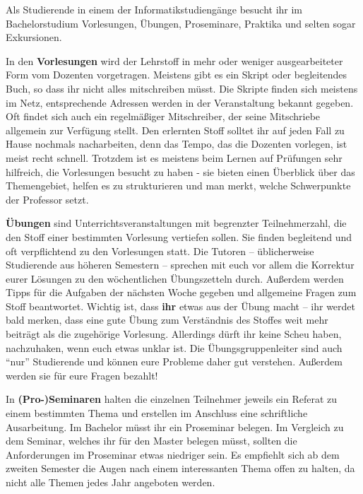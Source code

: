 
Als Studierende in einem der Informatikstudiengänge besucht ihr im
  Bachelorstudium Vorlesungen, Übungen, Proseminare, Praktika
  und selten sogar Exkursionen.

In den \textbf{Vorlesungen} wird der Lehrstoff in mehr oder weniger
  ausgearbeiteter Form vom Dozenten vorgetragen.  Meistens gibt
  es ein Skript oder begleitendes Buch, so dass ihr nicht alles mitschreiben 
  müsst.  Die Skripte finden sich meistens im Netz, entsprechende Adressen 
  werden in der Veranstaltung bekannt gegeben. Oft findet sich auch ein 
  regelmäßiger Mitschreiber, der seine Mitschriebe allgemein zur Verfügung 
  stellt. Den erlernten Stoff solltet ihr auf jeden Fall zu Hause nochmals 
  nacharbeiten, denn das Tempo, das die Dozenten vorlegen, ist meist recht 
  schnell. Trotzdem ist es meistens beim Lernen auf Prüfungen sehr hilfreich, 
  die Vorlesungen besucht zu haben - sie bieten einen Überblick über das 
  Themengebiet, helfen es zu strukturieren und man merkt, welche Schwerpunkte 
  der Professor setzt.

\textbf{Übungen} sind Unterrichtsveranstaltungen mit begrenzter
  Teilnehmerzahl, die den Stoff einer bestimmten Vorlesung vertiefen
  sollen. Sie finden begleitend und oft verpflichtend zu den
  Vorlesungen statt. Die Tutoren -- üblicherweise Studierende aus höheren
  Semestern -- sprechen mit euch vor allem die Korrektur eurer
  Lösungen zu den wöchentlichen Übungszetteln durch.  Außerdem
  werden Tipps für die Aufgaben der nächsten Woche gegeben und
  allgemeine Fragen zum Stoff beantwortet.  Wichtig ist, dass \textbf{ihr}
  etwas aus der Übung macht -- ihr werdet bald merken, dass eine gute
  Übung zum Verständnis des Stoffes weit mehr beiträgt als die
  zugehörige Vorlesung.  Allerdings dürft ihr keine Scheu haben,
  nachzuhaken, wenn euch etwas unklar ist.  Die Übungsgruppenleiter
  sind auch "`nur"' Studierende und können eure Probleme daher gut
  verstehen.  Außerdem werden sie für eure Fragen bezahlt!

In \textbf{(Pro-)Seminaren} halten die einzelnen Teilnehmer jeweils ein
  Referat zu einem bestimmten Thema und erstellen im Anschluss eine schriftliche
  Ausarbeitung.  Im Bachelor müsst ihr ein Proseminar belegen.  Im
  Vergleich zu dem Seminar, welches ihr für den Master belegen müsst, sollten 
  die Anforderungen im Proseminar etwas niedriger sein. Es empfiehlt sich ab
  dem zweiten Semester die Augen nach einem interessanten Thema offen zu
  halten, da nicht alle Themen jedes Jahr angeboten werden.

